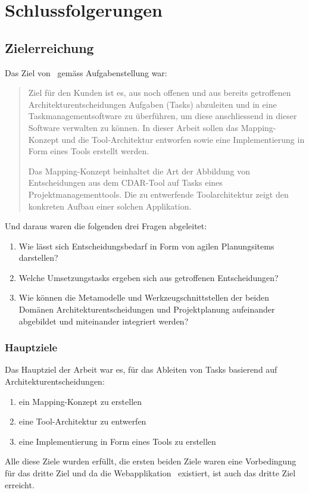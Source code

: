 \chapter{Schlussfolgerungen}
	
	\section{Zielerreichung}
		Das Ziel von \eeppi\ gemäss Aufgabenstellung war:
		\begin{quote}
			Ziel für den Kunden ist es, aus noch offenen und aus bereits getroffenen Architekturentscheidungen  Aufgaben (Tasks) abzuleiten und in eine Taskmanagementsoftware zu überführen, um diese anschliessend in dieser Software verwalten zu können. In dieser Arbeit sollen das Mapping-Konzept und die Tool-Architektur entworfen sowie eine Implementierung in Form eines Tools erstellt werden.
			
			Das Mapping-Konzept beinhaltet die Art der Abbildung von Entscheidungen aus dem CDAR-Tool auf Tasks eines Projektmanagementtools. Die zu entwerfende Toolarchitektur zeigt den konkreten Aufbau einer solchen Applikation.
		\end{quote}
	Und daraus waren die folgenden drei Fragen abgeleitet:
	\begin{enumerate}
		\item{Wie lässt sich Entscheidungsbedarf in Form von agilen Planungsitems darstellen?}
		\item{Welche Umsetzungstasks ergeben sich aus getroffenen Entscheidungen?}
		\item{Wie können die Metamodelle und Werkzeugschnittstellen der beiden Domänen Architekturentscheidungen und Projektplanung aufeinander abgebildet und miteinander integriert werden?}
	\end{enumerate}
	
	\subsection{Hauptziele}
		Das Hauptziel der Arbeit war es, für das Ableiten von Tasks basierend auf Architekturentscheidungen:
		\begin{enumerate}
			\item{ein Mapping-Konzept zu erstellen}
			\item{eine Tool-Architektur zu entwerfen}
			\item{eine Implementierung in Form eines Tools zu erstellen}
		\end{enumerate}
		Alle diese Ziele wurden erfüllt,
		die ersten beiden Ziele waren eine Vorbedingung für das dritte Ziel
		und da die Webapplikation \eeppi\ existiert, ist auch das dritte Ziel erreicht.
	
